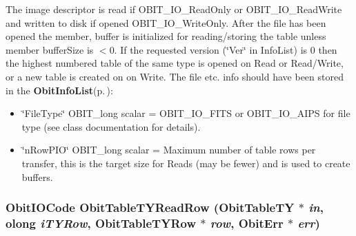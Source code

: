 The image descriptor is read if OBIT\_\-IO\_\-Read\-Only or OBIT\_\-IO\_\-Read\-Write and written to disk if opened OBIT\_\-IO\_\-Write\-Only. After the file has been opened the member, buffer is initialized for reading/storing the table unless member buffer\-Size is $<$0. If the requested version (\char`\"{}Ver\char`\"{} in Info\-List) is 0 then the highest numbered table of the same type is opened on Read or Read/Write, or a new table is created on on Write. The file etc. info should have been stored in the {\bf Obit\-Info\-List}{\rm (p.\,\pageref{structObitInfoList})}: \begin{itemize}
\item \char`\"{}File\-Type\char`\"{} OBIT\_\-long scalar = OBIT\_\-IO\_\-FITS or OBIT\_\-IO\_\-AIPS for file type (see class documentation for details). \item \char`\"{}n\-Row\-PIO\char`\"{} OBIT\_\-long scalar = Maximum number of table rows per transfer, this is the target size for Reads (may be fewer) and is used to create buffers. 
\end{itemize}
\subsubsection{\setlength{\rightskip}{0pt plus 5cm}Obit\-IOCode Obit\-Table\-TYRead\-Row ({\bf Obit\-Table\-TY} $\ast$ {\em in}, {\bf olong} {\em i\-TYRow}, {\bf Obit\-Table\-TYRow} $\ast$ {\em row}, {\bf Obit\-Err} $\ast$ {\em err})}\label{ObitTableTY_8c_a22}


